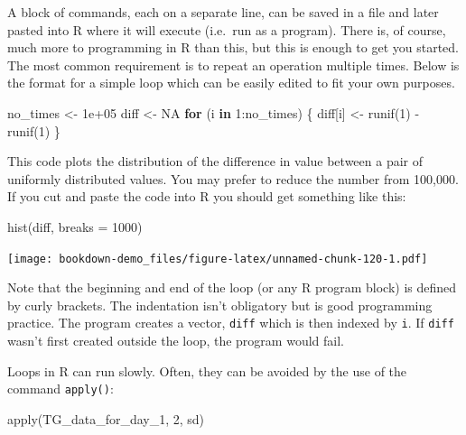 \documentclass[
]{book}
\newenvironment{Shaded}{\begin{snugshade}}{\end{snugshade}}
\newcommand{\AttributeTok}[1]{\textcolor[rgb]{0.77,0.63,0.00}{#1}}
\newcommand{\ConstantTok}[1]{\textcolor[rgb]{0.00,0.00,0.00}{#1}}
\newcommand{\ControlFlowTok}[1]{\textcolor[rgb]{0.13,0.29,0.53}{\textbf{#1}}}
\newcommand{\DecValTok}[1]{\textcolor[rgb]{0.00,0.00,0.81}{#1}}
\newcommand{\FloatTok}[1]{\textcolor[rgb]{0.00,0.00,0.81}{#1}}
\newcommand{\FunctionTok}[1]{\textcolor[rgb]{0.00,0.00,0.00}{#1}}
\newcommand{\NormalTok}[1]{#1}
\newcommand{\OtherTok}[1]{\textcolor[rgb]{0.56,0.35,0.01}{#1}}
\newcommand{\SpecialCharTok}[1]{\textcolor[rgb]{0.00,0.00,0.00}{#1}}
\begin{document}
A block of commands, each on a separate line, can be saved in a file and later pasted into R where it will execute (i.e.~run as a program). There is, of course, much more to programming in R than this, but this is enough to get you started. The most common requirement is to repeat an operation multiple times. Below is the format for a simple loop which can be easily edited to fit your own purposes.

\begin{Shaded}
\begin{Highlighting}[]
\NormalTok{no\_times }\OtherTok{\textless{}{-}} \FloatTok{1e+05}
\NormalTok{diff }\OtherTok{\textless{}{-}} \ConstantTok{NA}
\ControlFlowTok{for}\NormalTok{ (i }\ControlFlowTok{in} \DecValTok{1}\SpecialCharTok{:}\NormalTok{no\_times) \{}
\NormalTok{    diff[i] }\OtherTok{\textless{}{-}} \FunctionTok{runif}\NormalTok{(}\DecValTok{1}\NormalTok{) }\SpecialCharTok{{-}} \FunctionTok{runif}\NormalTok{(}\DecValTok{1}\NormalTok{)}
\NormalTok{\}}
\end{Highlighting}
\end{Shaded}

This code plots the distribution of the difference in value between a pair of uniformly distributed values. You may prefer to reduce the number from 100,000. If you cut and paste the code into R you should get something like this:

\begin{Shaded}
\begin{Highlighting}[]
\FunctionTok{hist}\NormalTok{(diff, }\AttributeTok{breaks =} \DecValTok{1000}\NormalTok{)}
\end{Highlighting}
\end{Shaded}

\texttt{[image: bookdown-demo\_files/figure-latex/unnamed-chunk-120-1.pdf]}

Note that the beginning and end of the loop (or any R program block) is defined by curly brackets. The indentation isn't obligatory but is good programming practice. The program creates a vector, \texttt{diff} which is then indexed by \texttt{i}. If \texttt{diff} wasn't first created outside the loop, the program would fail.

Loops in R can run slowly. Often, they can be avoided by the use of the command \texttt{apply()}:

\begin{Shaded}
\begin{Highlighting}[]
\FunctionTok{apply}\NormalTok{(TG\_data\_for\_day\_1, }\DecValTok{2}\NormalTok{, sd)}
\end{Highlighting}
\end{Shaded}
\end{document}
